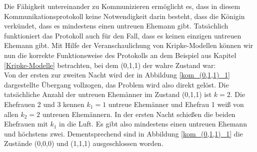 Die Fähigkeit untereinander zu Kommunizieren ermöglicht es, dass in diesem Kommunikationsprotokoll keine Notwendigkeit darin besteht, dass die Königin verkündet, dass es mindestens einen untreuen Ehemann gibt. Tatsächlich funktioniert das Protokoll auch für den Fall, dass es keinen einzigen untreuen Ehemann gibt.
Mit Hilfe der Veranschaulichung von Kripke-Modellen können wir nun die korrekte Funktionsweise des Protokolls an dem Beispiel aus Kapitel \ref{Kripke-Modelle} betrachten, bei dem (0,1,1) der wahre Zustand war:\\
Von der ersten zur zweiten Nacht wird der in Abbildung \ref{kom_(0,1,1)_1} dargestellte Übergang vollzogen, das Problem wird also direkt gelöst.
Die tatsächliche Anzahl der untreuen Ehemänner im Zustand (0,1,1) ist $k=2$. Die Ehefrauen 2 und 3 kennen $k_1 = 1$ untreue Ehemänner und Ehefrau 1 weiß von allen $k_2 = 2$ untreuen Ehemännern.
In der ersten Nacht schießen die beiden Ehefrauen mit $k_1$ in die Luft. Es gibt also mindestens einen untreuen Ehemann und höchstens zwei.
Dementsprechend sind in Abbildung \ref{kom_(0,1,1)_1} die Zustände (0,0,0) und (1,1,1) ausgeschlossen worden.

